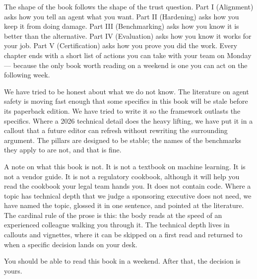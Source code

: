The shape of the book follows the shape of the trust question. Part I (Alignment) asks how you tell an agent what you want. Part II (Hardening) asks how you keep it from doing damage. Part III (Benchmarking) asks how you know it is better than the alternative. Part IV (Evaluation) asks how you know it works for your job. Part V (Certification) asks how you prove you did the work. Every chapter ends with a short list of actions you can take with your team on Monday --- because the only book worth reading on a weekend is one you can act on the following week.

We have tried to be honest about what we do not know. The literature on agent safety is moving fast enough that some specifics in this book will be stale before its paperback edition. We have tried to write it so the framework outlasts the specifics. Where a 2026 technical detail does the heavy lifting, we have put it in a callout that a future editor can refresh without rewriting the surrounding argument. The pillars are designed to be stable; the names of the benchmarks they apply to are not, and that is fine.

A note on what this book is not. It is not a textbook on machine learning. It is not a vendor guide. It is not a regulatory cookbook, although it will help you read the cookbook your legal team hands you. It does not contain code. Where a topic has technical depth that we judge a sponsoring executive does not need, we have named the topic, glossed it in one sentence, and pointed at the literature. The cardinal rule of the prose is this: the body reads at the speed of an experienced colleague walking you through it. The technical depth lives in callouts and vignettes, where it can be skipped on a first read and returned to when a specific decision lands on your desk.

You should be able to read this book in a weekend. After that, the decision is yours.

\stoptwocol
